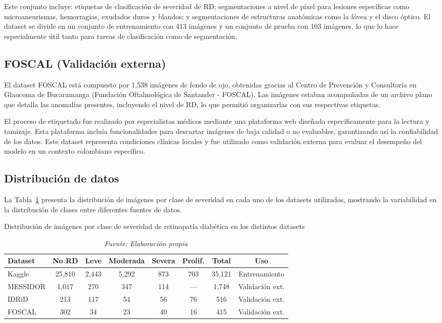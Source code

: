 Este conjunto incluye: etiquetas de clasificación de severidad de RD; segmentaciones a 
nivel de píxel para lesiones específicas como microaneurismas, hemorragias, exudados 
duros y blandos; y segmentaciones de estructuras anatómicas como la fóvea y el disco 
óptico. El dataset se divide en un conjunto de entrenamiento con 413 imágenes y un 
conjunto de prueba con 103 imágenes, lo que lo hace especialmente útil tanto para tareas 
de clasificación como de segmentación.

\subsection{FOSCAL (Validación externa)}

El dataset FOSCAL está compuesto por 1,538 imágenes de fondo de ojo, obtenidas gracias al 
Centro de Prevención y Consultoría en Glaucoma de Bucaramanga (Fundación Oftalmológica de 
Santander - FOSCAL). Las imágenes estaban acompañadas de un archivo plano que detalla las 
anomalías presentes, incluyendo el nivel de RD, lo que permitió 
organizarlas con sus respectivas etiquetas.

El proceso de etiquetado fue realizado por especialistas médicos mediante una plataforma 
web diseñada específicamente para la lectura y tamizaje. Esta plataforma incluía 
funcionalidades para descartar imágenes de baja calidad o no evaluables, garantizando así 
la confiabilidad de los datos. Este dataset representa condiciones clínicas locales y fue 
utilizado como validación externa para evaluar el desempeño del modelo en un contexto 
colombiano específico.

\subsection{Distribución de datos}

La Tabla~\ref{tab:distribucion_clases} presenta la distribución de imágenes por clase de 
severidad en cada uno de los datasets utilizados, mostrando la variabilidad en la 
distribución de clases entre diferentes fuentes de datos.

\begin{table}[H]
	\centering
	\renewcommand{\arraystretch}{1.5}
	\caption{Distribución de imágenes por clase de severidad de retinopatía diabética 
en los distintos datasets}
	\label{tab:distribucion_clases}
	\begin{tabularx}{\textwidth}{X c c c c c c c}
		\hline
		\textbf{Dataset} & \textbf{No RD} & \textbf{Leve} & \textbf{Moderada} & 
\textbf{Severa} & \textbf{Prolif.} & \textbf{Total} & \textbf{Uso} \\
		\hline
		Kaggle & 25,810 & 2,443 & 5,292 & 873 & 703 & 35,121 & Entrenamiento \\
		MESSIDOR & 1,017 & 270 & 347 & 114 & --- & 1,748 & Validación ext. \\
		IDRiD & 213 & 117 & 54 & 56 & 76 & 516 & Validación ext. \\
		FOSCAL & 302 & 34 & 23 & 40 & 16 & 415 & Validación ext. \\
		\hline
	\end{tabularx}
	\caption*{\textit{Fuente: Elaboración propia}}
\end{table}

